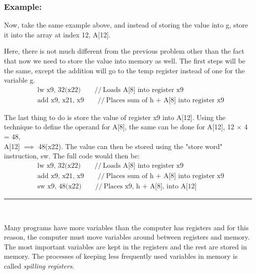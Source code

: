 \documentclass[12pt]{article}
\begin{document}
    \subsubsection*{Example:}
    \par Now, take the same example above, and instead of storing the value into
    g, store it into the array at index 12, A[12].
    \par Here, there is not much different from the previous problem other than
    the fact that now we need to store the value into memory as well. The first
    steps will be the same, except the addition will go to the temp register
    instead of one for the variable g.
    \begin{align*}
        & \text{lw x9, 32(x22)}\qquad //\ \text{Loads A[8] into register x9} \\
        & \text{add x9, x21, x9}\qquad //\ \text{Places sum of h + A[8] into register x9}
    \end{align*}
    \par The last thing to do is store the value of register x9 into A[12].
    Using the technique to define the operand for A[8], the same can be done for
    A[12], 12 $\times$ 4 = 48, \\ A[12] $\implies$ 48(x22). The value can then be
    stored using the "store word" instruction, sw. The full code would then be:
    \begin{align*}
        & \text{lw x9, 32(x22)}\qquad //\ \text{Loads A[8] into register x9} \\
        & \text{add x9, x21, x9}\qquad //\ \text{Places sum of h + A[8] into register x9} \\
        & \text{sw x9, 48(x22)}\qquad //\ \text{Places x9, h + A[8], into A[12]}
    \end{align*}
    \rule{\textwidth}{0.25pt} \\
    \par Many programs have more variables than the computer has registers and
    for this reason, the computer must move variables around between registers
    and memory. The most important variables are kept in the registers and the
    rest are stored in memory. The processes of keeping less frequently used
    variables in memory is called \textit{spilling registers}.
\end{document}

